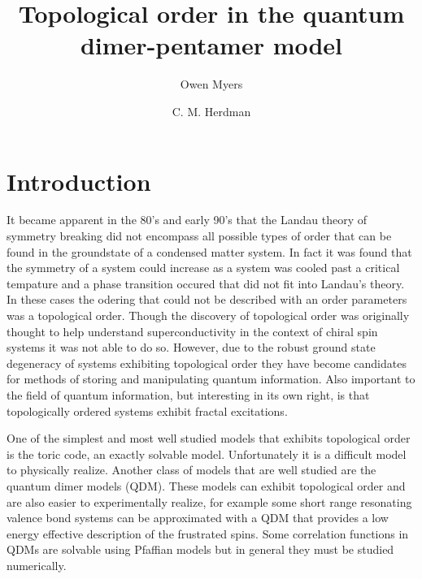 \documentclass[twocolumn,prb,aps,floatfix,superscriptaddress]{revtex4-1}
\begin{document}
\title{Topological order in the quantum dimer-pentamer model}

\author{Owen Myers}

\author{C. M. Herdman}

\begin{abstract}

\end{abstract}

\maketitle

\section{Introduction}



    It became apparent in the 80's and early 90's that the Landau theory of symmetry breaking did not
    encompass all possible types of order that can be found in the groundstate of a condensed matter system. 
    In fact it was found that the symmetry of a system
    could increase as a system was cooled past a critical tempature and a phase transition occured
    that did not fit into Landau's theory. In these cases the odering 
    that could not be described with an order
    parameters~\cite{Wen1990} was a topological order. Though the discovery of topological order was originally thought
    to help understand superconductivity in the context of chiral spin systems \cite{HERE} it was
    not able to do so. However, due to the robust ground state degeneracy of systems exhibiting
    topological order they have become candidates for methods of storing and manipulating
    quantum information.  Also important to the field of quantum information, but interesting in
    its own right, is that topologically ordered systems exhibit fractal excitations. 

    One of the simplest and most well studied models that exhibits topological order is the
    toric code, an exactly solvable model. Unfortunately it is
    a difficult model to physically realize. Another class of models that are well studied are
    the quantum dimer models (QDM).  These models can exhibit topological order and are also
    easier to experimentally realize, for example some short range resonating valence bond
    systems can be approximated with a QDM that provides a low energy effective description of
    the frustrated spins. Some correlation functions in QDMs are solvable using Pfaffian models
    but in general they must be studied numerically. 
\end{document}
